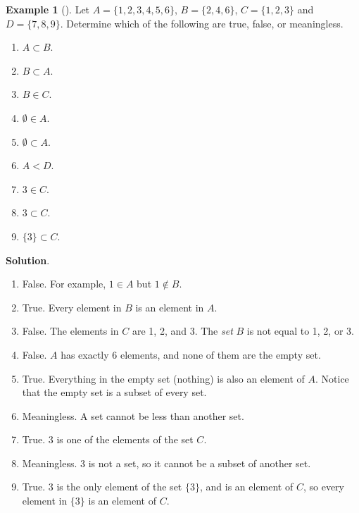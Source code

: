 \documentclass[10pt,]{book}
\theoremstyle{plain}
\theoremstyle{definition}
\theoremstyle{definition}
\newtheorem{example}[theorem]{Example}
\theoremstyle{definition}
\theoremstyle{definition}
\numberwithin{equation}{chapter}
\newcommand{\lt}{<}
\begin{document}
\begin{example}[]\label{example-40}
\hypertarget{p-1591}{}%
Let \(A = \{1, 2, 3, 4, 5, 6\}\), \(B = \{2, 4, 6\}\), \(C = \{1, 2, 3\}\) and \(D = \{7, 8, 9\}\). Determine which of the following are true, false, or meaningless.%
\par
\hypertarget{p-1592}{}%
\leavevmode%
\begin{enumerate}
\item\hypertarget{li-440}{}\(A \subset B\).%
\item\hypertarget{li-441}{}\(B \subset A\).%
\item\hypertarget{li-442}{}\(B \in C\).%
\item\hypertarget{li-443}{}\(\emptyset \in A\).%
\item\hypertarget{li-444}{}\(\emptyset \subset A\).%
\item\hypertarget{li-445}{}\(A \lt  D\).%
\item\hypertarget{li-446}{}\(3 \in C\).%
\item\hypertarget{li-447}{}\(3 \subset C\).%
\item\hypertarget{li-448}{}\(\{3\} \subset C\).%
\end{enumerate}
%
\par\smallskip%
\noindent\textbf{Solution}.\hypertarget{solution-131}{}\quad%
\hypertarget{p-1593}{}%
\leavevmode%
\begin{enumerate}
\item\hypertarget{li-449}{}\hypertarget{p-1594}{}%
False. For example, \(1\in A\) but \(1 \notin B\).%
\item\hypertarget{li-450}{}\hypertarget{p-1595}{}%
True. Every element in \(B\) is an element in \(A\).%
\item\hypertarget{li-451}{}\hypertarget{p-1596}{}%
False. The elements in \(C\) are 1, 2, and 3. The \emph{set} \(B\) is not equal to 1, 2, or 3.%
\item\hypertarget{li-452}{}\hypertarget{p-1597}{}%
False. \(A\) has exactly 6 elements, and none of them are the empty set.%
\item\hypertarget{li-453}{}\hypertarget{p-1598}{}%
True. Everything in the empty set (nothing) is also an element of \(A\). Notice that the empty set is a subset of every set.%
\item\hypertarget{li-454}{}\hypertarget{p-1599}{}%
Meaningless. A set cannot be less than another set.%
\item\hypertarget{li-455}{}\hypertarget{p-1600}{}%
True. \(3\) is one of the elements of the set \(C\).%
\item\hypertarget{li-456}{}\hypertarget{p-1601}{}%
Meaningless. \(3\) is not a set, so it cannot be a subset of another set.%
\item\hypertarget{li-457}{}\hypertarget{p-1602}{}%
True. \(3\) is the only element of the set \(\{3\}\), and is an element of \(C\), so every element in \(\{3\}\) is an element of \(C\).%
\end{enumerate}
%
\end{example}
\end{document}
